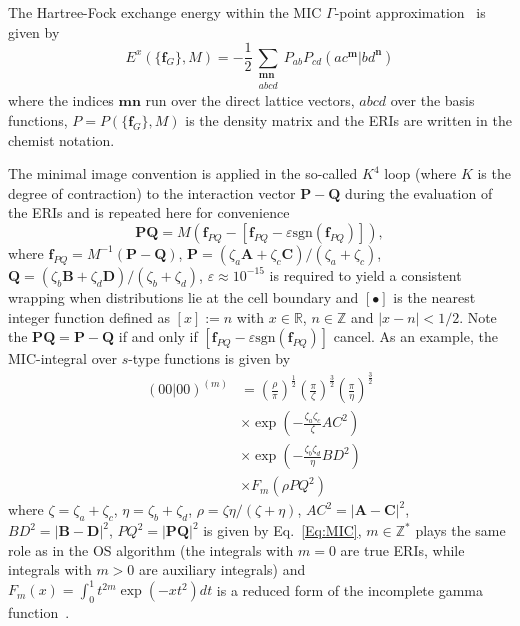 \documentclass[prl,twocolumn,showpacs,twocolumngrid,superbib]{revtex4}
\begin{document}
The Hartree-Fock exchange energy within the MIC $\Gamma$-point approximation~\cite{CTymczak04b} 
is given by
\begin{equation}
 E^x(\{\mathbf{f}_G\},M)=
 -\frac{1}{2}\sum_{\substack{\mathbf{m}\mathbf{n}\\a b c d}}P_{ab}P_{cd}
 (ac^\mathbf{m}|bd^\mathbf{n})
\end{equation}
where the indices $\mathbf{mn}$ run over the direct lattice vectors, 
$abcd$ over the basis functions, $P=P(\{\mathbf{f}_G\},M)$ is the density matrix 
and the ERIs are written in the chemist notation.

The minimal image convention is applied in the so-called $K^4$ loop 
(where $K$ is the degree of contraction)
to the interaction vector $\mathbf{P-Q}$ during the evaluation of the ERIs and is 
repeated here for convenience 
\begin{equation}\label{Eq:MIC}
  \mathbf{PQ}=M(\mathbf{f}_{PQ}-[\mathbf{f}_{PQ}-\varepsilon \mathrm{sgn}(\mathbf{f}_{PQ})]),
\end{equation}
where $\mathbf{f}_{PQ}=M^{-1}(\mathbf{P-Q})$, 
$\mathbf{P}=(\zeta_a\mathbf{A}+\zeta_c\mathbf{C})/(\zeta_a+\zeta_c)$, 
$\mathbf{Q}=(\zeta_b\mathbf{B}+\zeta_d\mathbf{D})/(\zeta_b+\zeta_d)$, 
$\varepsilon\approx 10^{-15}$ is 
required to yield a consistent wrapping when distributions lie at the cell boundary 
and $[\bullet]$ is the nearest integer function defined as 
$[x]:=n$ with $x\in \mathbb{R}$, $n\in \mathbb{Z}$ and $|x-n|<1/2$.
Note the $\mathbf{PQ}=\mathbf{P-Q}$ if and only if $[\mathbf{f}_{PQ}-\varepsilon\mathrm{sgn}(\mathbf{f}_{PQ})]$ cancel.
As an example, the MIC-integral over $s$-type functions is given by
\begin{equation}
  \begin{split}
  (00|00)^{(m)}&=\left(\frac{\rho}{\pi}\right)^{\frac{1}{2}}
    \left(\frac{\pi}{\zeta}\right)^{\frac{3}{2}}\left(\frac{\pi}{\eta}\right)^{\frac{3}{2}}\\
    &\times\exp\left(-\frac{\zeta_a\zeta_c}{\zeta}AC^2\right) \\
    &\times\exp\left(-\frac{\zeta_b\zeta_d}{\eta}BD^2\right) \\
    &\times F_{m}(\rho PQ^2)
  \end{split}
\end{equation}
where $\zeta=\zeta_a+\zeta_c$, $\eta=\zeta_b+\zeta_d$, $\rho=\zeta\eta/(\zeta+\eta)$,
$AC^2=|\mathbf{A-C}|^2$, $BD^2=|\mathbf{B-D}|^2$, $PQ^2=|\mathbf{PQ}|^2$ 
is given by Eq.~\ref{Eq:MIC}, $m\in\mathbb{Z}^*$ plays %
the same role as in the OS algorithm (the integrals with $m=0$ are true ERIs, while
integrals with $m>0$ are auxiliary integrals)
and $F_m(x)=\int_0^1t^{2m}\exp(-xt^2)dt$ is a reduced form of the incomplete gamma function~\cite{IShavitt63}.
\end{document}
